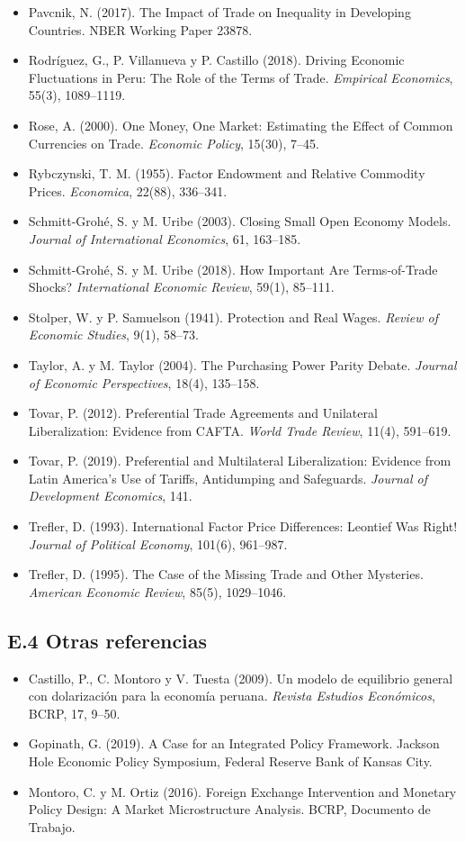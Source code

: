 \documentclass[11pt,a4paper]{article}
\begin{document}
{\begin{itemize}[leftmargin=1.4em,itemsep=1pt,label={}]
\item Pavcnik, N. (2017). The Impact of Trade on Inequality in Developing Countries. NBER Working Paper 23878.
\item Rodríguez, G., P. Villanueva y P. Castillo (2018). Driving Economic Fluctuations in Peru: The Role of the Terms of Trade. \emph{Empirical Economics}, 55(3), 1089--1119.
\item Rose, A. (2000). One Money, One Market: Estimating the Effect of Common Currencies on Trade. \emph{Economic Policy}, 15(30), 7--45.
\item Rybczynski, T. M. (1955). Factor Endowment and Relative Commodity Prices. \emph{Economica}, 22(88), 336--341.
\item Schmitt-Grohé, S. y M. Uribe (2003). Closing Small Open Economy Models. \emph{Journal of International Economics}, 61, 163--185.
\item Schmitt-Grohé, S. y M. Uribe (2018). How Important Are Terms-of-Trade Shocks? \emph{International Economic Review}, 59(1), 85--111.
\item Stolper, W. y P. Samuelson (1941). Protection and Real Wages. \emph{Review of Economic Studies}, 9(1), 58--73.
\item Taylor, A. y M. Taylor (2004). The Purchasing Power Parity Debate. \emph{Journal of Economic Perspectives}, 18(4), 135--158.
\item Tovar, P. (2012). Preferential Trade Agreements and Unilateral Liberalization: Evidence from CAFTA. \emph{World Trade Review}, 11(4), 591--619.
\item Tovar, P. (2019). Preferential and Multilateral Liberalization: Evidence from Latin America's Use of Tariffs, Antidumping and Safeguards. \emph{Journal of Development Economics}, 141.
\item Trefler, D. (1993). International Factor Price Differences: Leontief Was Right! \emph{Journal of Political Economy}, 101(6), 961--987.
\item Trefler, D. (1995). The Case of the Missing Trade and Other Mysteries. \emph{American Economic Review}, 85(5), 1029--1046.
\end{itemize}
}

\subsection*{E.4 Otras referencias}
{\small
\begin{itemize}[leftmargin=1.4em,itemsep=1pt,label={}]
\item Castillo, P., C. Montoro y V. Tuesta (2009). Un modelo de equilibrio general con dolarización para la economía peruana. \emph{Revista Estudios Económicos}, BCRP, 17, 9--50.
\item Gopinath, G. (2019). A Case for an Integrated Policy Framework. Jackson Hole Economic Policy Symposium, Federal Reserve Bank of Kansas City.
\item Montoro, C. y M. Ortiz (2016). Foreign Exchange Intervention and Monetary Policy Design: A Market Microstructure Analysis. BCRP, Documento de Trabajo.
\end{itemize}
}
\end{document}

